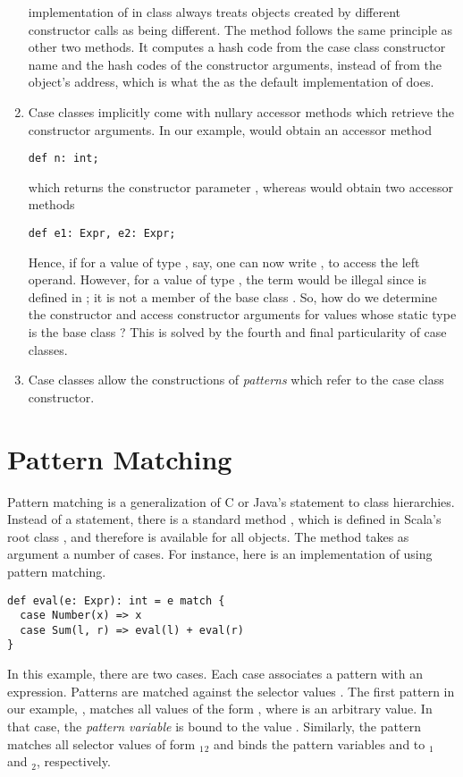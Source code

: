 \begin{enumerate}
implementation of  in class  always treats
objects created by different constructor calls as being different.
The  method follows the same principle as other two
methods. It computes a hash code from the case class constructor name
and the hash codes of the constructor arguments, instead of from the object's
address, which is what the as the default implementation of  does.
\item 
Case classes implicitly come with nullary accessor methods which
retrieve the constructor arguments.
In our example,  would obtain an accessor method
\begin{lstlisting}
def n: int;
\end{lstlisting}
which returns the constructor parameter , whereas  would obtain two accessor methods
\begin{lstlisting}
def e1: Expr, e2: Expr;
\end{lstlisting}
Hence, if for a value  of type , say, one can now
write , to access the left operand. However, for a value
 of type , the term  would be illegal
since  is defined in ; it is not a member of the
base class . 
So, how do we determine the constructor and access constructor
arguments for values whose static type is the base class ?
This is solved by the fourth and final particularity of case classes.
\item 
Case classes allow the constructions of {\em patterns} which refer to
the case class constructor.
\end{enumerate}

\section{Pattern Matching}

Pattern matching is a generalization of C or Java's 
statement to class hierarchies. Instead of a  statement,
there is a standard method , which is defined in Scala's
root class , and therefore is available for all objects.
The  method takes as argument a number of cases. 
For instance, here is an implementation of  using 
pattern matching.
\begin{lstlisting}
def eval(e: Expr): int = e match { 
  case Number(x) => x 
  case Sum(l, r) => eval(l) + eval(r) 
}
\end{lstlisting}
In this example, there are two cases. Each case associates a pattern
with an expression. Patterns are matched against the selector
values .  The first pattern in our example,
, matches all values of the form , 
where  is an arbitrary value.  In that case, the {\em pattern
variable}  is bound to the value . Similarly, the
pattern  matches all selector values of form
$_1$$_2$\code{)} and binds the pattern variables
 and  
to $_1$ and $_2$, respectively. 

